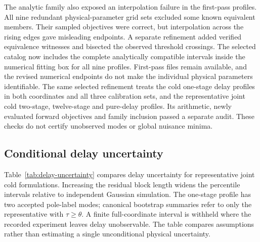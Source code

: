 \documentclass[11pt]{article}
\begin{document}
The analytic family also exposed an interpolation failure in the first-pass
profiles. All nine redundant physical-parameter grid sets excluded some known
equivalent members. Their sampled objectives were correct, but interpolation
across the rising edges gave misleading endpoints. A separate refinement added
verified equivalence witnesses and bisected the observed threshold crossings.
The selected catalog now includes the complete analytically compatible intervals
inside the numerical fitting box for all nine profiles. First-pass files remain
available, and the revised numerical endpoints do not make the individual
physical parameters identifiable. The same selected refinement treats the cold
one-stage delay profiles in both coordinates and all three calibration sets,
and the representative joint cold two-stage, twelve-stage and pure-delay
profiles. Its arithmetic, newly evaluated forward objectives and family inclusion
passed a separate audit. These checks do not certify unobserved modes or global
nuisance minima.

\subsection{Conditional delay uncertainty}
Table~\ref{tab:delay-uncertainty} compares delay uncertainty for representative
joint cold formulations. Increasing the residual block length widens the
percentile intervals relative to independent Gaussian simulation. The one-stage
profile has two accepted pole-label modes; canonical bootstrap summaries refer
to only the representative with $\tau\geq\theta$. A finite full-coordinate
interval is withheld where the recorded experiment leaves delay unobservable.
The table compares assumptions rather than estimating a single unconditional
physical uncertainty.
\end{document}
